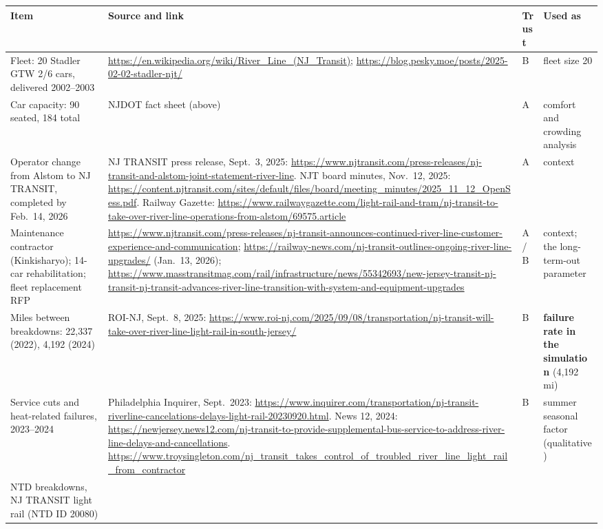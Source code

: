 \documentclass[11pt]{article}
\begin{document}
\begin{longtable}{@{}p{3.3cm}p{7.8cm}p{1.0cm}p{2.6cm}@{}}
\toprule
Item & Source and link & Trust & Used as \\
\midrule
\endhead
Fleet: 20 Stadler GTW 2/6 cars, delivered 2002--2003 &
\url{https://en.wikipedia.org/wiki/River_Line_(NJ_Transit)}; \url{https://blog.pesky.moe/posts/2025-02-02-stadler-njt/} &
B & fleet size 20 \\
Car capacity: 90 seated, 184 total &
NJDOT fact sheet (above) &
A & comfort and crowding analysis \\
Operator change from Alstom to NJ TRANSIT, completed by Feb.~14, 2026 &
NJ TRANSIT press release, Sept.~3, 2025: \url{https://www.njtransit.com/press-releases/nj-transit-and-alstom-joint-statement-river-line}. NJT board minutes, Nov.~12, 2025: \url{https://content.njtransit.com/sites/default/files/board/meeting_minutes/2025_11_12_OpenSess.pdf}. Railway Gazette: \url{https://www.railwaygazette.com/light-rail-and-tram/nj-transit-to-take-over-river-line-operations-from-alstom/69575.article} &
A & context \\
Maintenance contractor (Kinkisharyo); 14-car rehabilitation; fleet replacement RFP &
\url{https://www.njtransit.com/press-releases/nj-transit-announces-continued-river-line-customer-experience-and-communication}; \url{https://railway-news.com/nj-transit-outlines-ongoing-river-line-upgrades/} (Jan.~13, 2026); \url{https://www.masstransitmag.com/rail/infrastructure/news/55342693/new-jersey-transit-nj-transit-nj-transit-advances-river-line-transition-with-system-and-equipment-upgrades} &
A/B & context; the long-term-out parameter \\
Miles between breakdowns: 22{,}337 (2022), 4{,}192 (2024) &
ROI-NJ, Sept.~8, 2025: \url{https://www.roi-nj.com/2025/09/08/transportation/nj-transit-will-take-over-river-line-light-rail-in-south-jersey/} &
B & \textbf{failure rate in the simulation} (4{,}192 mi) \\
Service cuts and heat-related failures, 2023--2024 &
Philadelphia Inquirer, Sept.~2023: \url{https://www.inquirer.com/transportation/nj-transit-riverline-cancelations-delays-light-rail-20230920.html}. News 12, 2024: \url{https://newjersey.news12.com/nj-transit-to-provide-supplemental-bus-service-to-address-river-line-delays-and-cancellations}. \url{https://www.troysingleton.com/nj_transit_takes_control_of_troubled_river_line_light_rail_from_contractor} &
B & summer seasonal factor (qualitative) \\
NTD breakdowns, NJ TRANSIT light rail (NTD ID 20080) &

\end{longtable}
\end{document}
